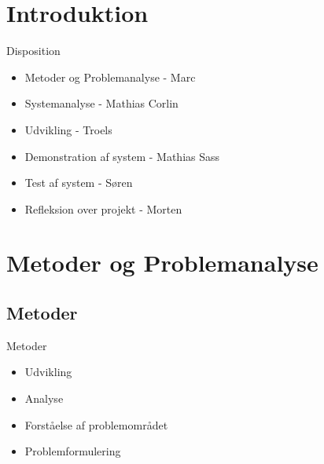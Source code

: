 \section{Introduktion}

\begin{frame}{Disposition}
\begin{itemize}
   \item Metoder og Problemanalyse - Marc
   \item Systemanalyse - Mathias Corlin
   \item Udvikling - Troels
   \item Demonstration af system - Mathias Sass
   \item Test af system - Søren
   \item Refleksion over projekt - Morten
\end{itemize}
\end{frame}

\section{Metoder og Problemanalyse}
\subsection{Metoder}
\begin{frame}{Metoder}
\begin{itemize}
   \item Udvikling
   \item Analyse
   \item Forståelse af problemområdet
   \item Problemformulering
\end{itemize}
\end{frame}

